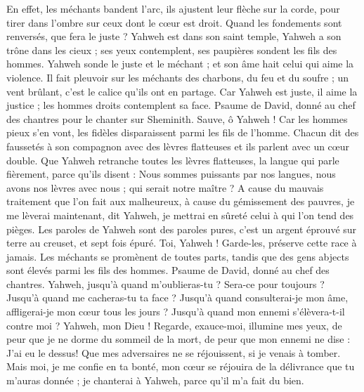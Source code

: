 \begin{multicols}{2}
En effet, les méchants bandent l'arc, ils ajustent leur flèche sur la corde, pour tirer dans l'ombre sur ceux dont le cœur est droit.
Quand les fondements sont renversés, que fera le juste ?
Yahweh est dans son saint temple, Yahweh a son trône dans les cieux ; ses yeux contemplent, ses paupières sondent les fils des hommes.
Yahweh sonde le juste et le méchant ; et son âme hait celui qui aime la violence.
Il fait pleuvoir sur les méchants des charbons, du feu et du soufre ; un vent brûlant, c'est le calice qu'ils ont en partage.
Car Yahweh est juste, il aime la justice ; les hommes droits contemplent sa face.
\VerseOne{}Psaume de David, donné au chef des chantres pour le chanter sur Sheminith.
Sauve, ô Yahweh ! Car les hommes pieux s'en vont, les fidèles disparaissent parmi les fils de l'homme.
Chacun dit des faussetés à son compagnon avec des lèvres flatteuses et ils parlent avec un cœur double.
Que Yahweh retranche toutes les lèvres flatteuses, la langue qui parle fièrement,
parce qu'ils disent : Nous sommes puissants par nos langues, nous avons nos lèvres avec nous ; qui serait notre maître ?
A cause du mauvais traitement que l'on fait aux malheureux, à cause du gémissement des pauvres, je me lèverai maintenant, dit Yahweh, je mettrai en sûreté celui à qui l'on tend des pièges.
Les paroles de Yahweh sont des paroles pures, c'est un argent éprouvé sur terre au creuset, et sept fois épuré.
Toi, Yahweh ! Garde-les, préserve cette race à jamais.
Les méchants se promènent de toutes parts, tandis que des gens abjects sont élevés parmi les fils des hommes.
\VerseOne{}Psaume de David, donné au chef des chantres.
Yahweh, jusqu'à quand m'oublieras-tu ? Sera-ce pour toujours ? Jusqu'à quand me cacheras-tu ta face ?
Jusqu'à quand consulterai-je mon âme, affligerai-je mon cœur tous les jours ? Jusqu'à quand mon ennemi s'élèvera-t-il contre moi ?
Yahweh, mon Dieu ! Regarde, exauce-moi, illumine mes yeux, de peur que je ne dorme du sommeil de la mort,
de peur que mon ennemi ne dise : J'ai eu le dessus! Que mes adversaires ne se réjouissent, si je venais à tomber.
Mais moi, je me confie en ta bonté, mon cœur se réjouira de la délivrance que tu m'auras donnée ; je chanterai à Yahweh, parce qu'il m'a fait du bien.

\end{multicols}
